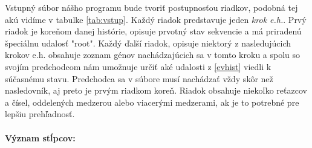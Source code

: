 Vstupný súbor nášho programu bude tvoriť postupnosťou riadkov, podobná tej akú vidíme v tabulke  \ref{tab:vstup}.
Každý riadok predstavuje jeden \emph{krok e.h.}.
Prvý riadok je koreňom danej histórie, opisuje prvotný stav sekvencie a má priradenú špeciálnu udalosť "root".
Každý ďalší riadok, opisuje niektorý z nasledujúcich krokov e.h. obsahuje zoznam génov nachádzajúcich sa v tomto kroku
a spolu so svojím predchodcom nám umožnuje určiť aké udalosti z \ref{evhist} viedli k súčasnému stavu.
Predchodca sa v súbore musí nachádzať vždy skôr než nasledovník, aj preto je prvým riadkom koreň.
\newline
Riadok obsahuje niekoľko reťazcov a čísel, oddelených medzerou alebo viacerými medzerami, ak je to potrebné pre lepšiu prehľadnosť.
\paragraph{Význam stĺpcov:}


